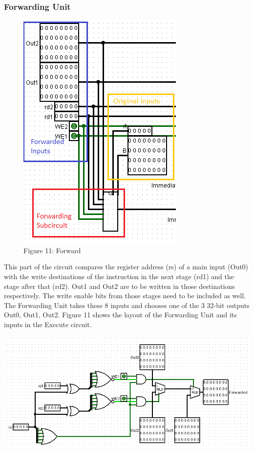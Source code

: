 \documentclass{article}
\begin{document}
\subsubsection{Forwarding Unit}
\begin{figure}
\vspace{-1.5cm}
\begin{center}
\includegraphics[scale=0.6]{Forward1.png} \\
Figure 11: Forward
\end{center}
\vspace{-5cm}
\end{figure}
This part of the circuit compares the register address (rs) of a main input (Out0) with the write destinations of the instruction in the next stage (rd1) and the stage after that (rd2). Out1 and Out2 are to be written in those destinations respectively. The write enable bits from those stages need to be included as well. The Forwarding Unit takes these 8 inputs and chooses one of the 3 32-bit outputs Out0, Out1, Out2. Figure 11 shows the layout of the Forwarding Unit and its inputs in the Execute circuit.

\includegraphics[scale=0.65]{Forward2.png}
\end{document}
